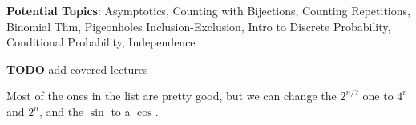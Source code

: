 \documentclass[handout]{mcs}
\begin{document}
\renewcommand{\reading}{
\begin{itemize}
\item
  Chapter~\bref{sec:coloring}--\bref{trees-sec}.\ \emph{Simple
    Graphs: Coloring, Connectedness}

\item Chapter~\bref{chap:asymptotics}
  through~\bref{sec:closed_products}.\ \emph{Sums \& Series}
  (omit~\bref{doublesum_sec})
\end{itemize}}


\begin{staffnotes}
\textbf{Potential Topics}: Asymptotics, Counting with Bijections,
Counting Repetitions, Binomial Thm, Pigeonholes Inclusion-Exclusion,
Intro to Discrete Probability, Conditional Probability, Independence

\textbf{TODO} add covered lectures
\end{staffnotes}


\begin{staffnotes}
Most of the ones in the list are pretty good, but we can change the
$2^{n/2}$ one to $4^n$ and $2^n$, and the $\sin$ to a $\cos$.
\end{staffnotes}


\end{document}
